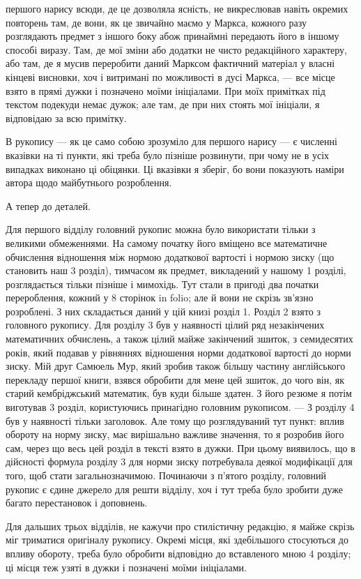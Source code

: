 \parcont{}  %
першого нарису всюди, де це дозволяла ясність, не викреслював
навіть окремих повторень там, де вони, як це звичайно маємо
у Маркса, кожного разу розглядають предмет з іншого боку
абож принаймні передають його в іншому способі виразу. Там, де
мої зміни або додатки не чисто редакційного характеру, або
там, де я мусив переробити даний Марксом фактичний матеріал
у власні кінцеві висновки, хоч і витримані по можливості в дусі
Маркса, — все місце взято в прямі дужки і позначено моїми ініціалами.
При моїх примітках під текстом подекуди немає дужок;
але там, де при них стоять мої ініціали, я відповідаю за всю
примітку.

В рукопису — як це само собою зрозуміло для першого нарису
— є численні вказівки на ті пункти, які треба було пізніше
розвинути, при чому не в усіх випадках виконано ці обіцянки.
Ці вказівки я зберіг, бо вони показують наміри автора щодо
майбутнього розроблення.

А тепер до деталей.

Для першого відділу головний рукопис можна було використати
тільки з великими обмеженнями. На самому початку його
вміщено все математичне обчислення відношення між нормою додаткової
вартості і нормою зиску (що становить наш 3 розділ),
тимчасом як предмет, викладений у нашому 1 розділі, розглядається
тільки пізніше і мимохідь. Тут стали в пригоді два
початки перероблення, кожний у 8 сторінок in folio; але й вони
не скрізь зв’язно розроблені. З них складається даний у цій
книзі розділ 1. Розділ 2 взято з головного рукопису. Для
розділу 3 був у наявності цілий ряд незакінчених математичних
обчислень, а також цілий майже закінчений зшиток, з семидесятих
років, який подавав у рівняннях відношення норми додаткової
вартості до норми зиску. Мій друг Самюель Мур, який зробив
також більшу частину англійського перекладу першої книги,
взявся обробити для мене цей зшиток, до чого він, як старий
кембріджський математик, був куди більше здатен. З його резюме
я потім виготував 3 розділ, користуючись принагідно головним
рукописом. — З розділу 4 був у наявності тільки заголовок.
Але тому що розглядуваний тут пункт: вплив обороту на
норму зиску, має вирішально важливе значення, то я розробив
його сам, через що весь цей розділ в тексті взято в дужки.
При цьому виявилось, що в дійсності формула розділу 3 для
норми зиску потребувала деякої модифікації для того, щоб стати
загальнозначимою. Починаючи з п’ятого розділу, головний рукопис
є єдине джерело для решти відділу, хоч і тут треба
було зробити дуже багато перестановок і доповнень.

Для дальших трьох відділів, не кажучи про стилістичну редакцію,
я майже скрізь міг триматися оригіналу рукопису. Окремі
місця, які здебільшого стосуються до впливу обороту, треба
було обробити відповідно до вставленого мною 4 розділу; ці
місця теж узяті в дужки і позначені моїми ініціалами.
